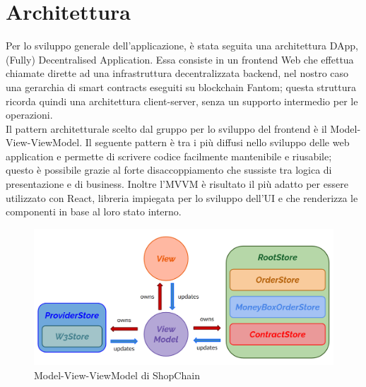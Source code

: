 \section{Architettura} \label{section:architettura}

Per lo sviluppo generale dell'applicazione, è stata seguita una architettura DApp\glo{}, (Fully) Decentralised Application.
Essa consiste in un frontend Web che effettua chiamate dirette ad una infrastruttura decentralizzata backend, nel 
nostro caso una gerarchia di smart contracts eseguiti su blockchain Fantom; 
questa struttura ricorda quindi una architettura client-server, senza un supporto intermedio per le operazioni.
\\
Il pattern architetturale\glo{} scelto dal gruppo per lo sviluppo del frontend è il Model-View-ViewModel\glo{}. Il
seguente pattern è tra i più diffusi nello sviluppo delle web application e permette di scrivere codice
facilmente mantenibile e riusabile; questo è possibile grazie al forte disaccoppiamento che sussiste tra
logica di presentazione e di business. Inoltre l'MVVM è risultato il più adatto per essere utilizzato con
React, libreria impiegata per lo sviluppo dell'UI e che renderizza le componenti in base al loro stato\glo{} interno.

\begin{figure}[H]
    \centering
    \includegraphics[scale=0.3]{immagini/mvvm.png}
    \caption{Model-View-ViewModel di ShopChain}
\end{figure}

